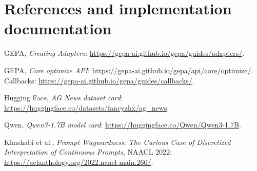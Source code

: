 \documentclass[11pt]{article}
\begin{document}
\section*{References and implementation documentation}
\begin{enumerate}[label={[\arabic*]},leftmargin=2.3em]
\item GEPA, \emph{Creating Adapters}: \url{https://gepa-ai.github.io/gepa/guides/adapters/}.
\item GEPA, \emph{Core optimize API}: \url{https://gepa-ai.github.io/gepa/api/core/optimize/}.\\ Callbacks: \url{https://gepa-ai.github.io/gepa/guides/callbacks/}.
\item Hugging Face, \emph{AG News dataset card}: \url{https://huggingface.co/datasets/fancyzhx/ag_news}.
\item Qwen, \emph{Qwen3-1.7B model card}: \url{https://huggingface.co/Qwen/Qwen3-1.7B}.
\item Khashabi et al., \emph{Prompt Waywardness: The Curious Case of Discretized Interpretation of Continuous Prompts}, NAACL 2022: \url{https://aclanthology.org/2022.naacl-main.266/}.
\end{enumerate}
\end{document}
